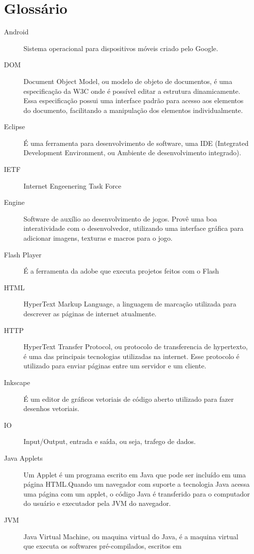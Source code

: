 
\section*{Glossário}

\begin{description}
\item[Android ] Sistema operacional para dispositivos móveis criado
pelo Google.
\item[DOM ] Document Object Model, ou modelo de objeto de documentos,
é uma especificação da W3C onde é possível editar a estrutura
dinamicamente. Essa especificação possui uma interface padrão para
acesso aos elementos do documento, facilitando a manipulação dos
elementos individualmente.
\item[Eclipse ] É uma ferramenta para desenvolvimento de software, uma
IDE (Integrated Development Environment, ou Ambiente de
desenvolvimento integrado).
\item[IETF ] Internet Engeenering Task Force
\item[Engine ] Software de auxílio ao desenvolvimento de jogos. Provê
uma boa interatividade com o desenvolvedor, utilizando uma interface
gráfica para adicionar imagens, texturas e macros para o jogo.
\item[Flash Player ] É a ferramenta da adobe que executa projetos
feitos com o Flash
\item[HTML ] HyperText Markup Language, a linguagem de marcação
utilizada para descrever as páginas de internet atualmente.
\item[HTTP ] HyperText Transfer Protocol, ou protocolo de
transferencia de hypertexto, é uma das principais tecnologias
utilizadas na internet. Esse protocolo é utilizado para enviar páginas
entre um servidor e um cliente.
\item[Inkscape ] É um editor de gráficos vetoriais de código aberto
utilizado para fazer desenhos vetoriais.
\item[IO ] Input/Output, entrada e saída, ou seja, trafego de dados.
\item[Java Applets ] Um Applet é um programa escrito em Java que pode
ser incluído em uma página HTML.Quando um navegador com suporte a
tecnologia Java acessa uma página com um applet, o código Java é
transferido para o computador do usuário e executador pela JVM do
navegador.
\item[JVM ] Java Virtual Machine, ou maquina virtual do Java, é a
maquina virtual que executa os softwares pré-compilados, escritos em

\end{description}
